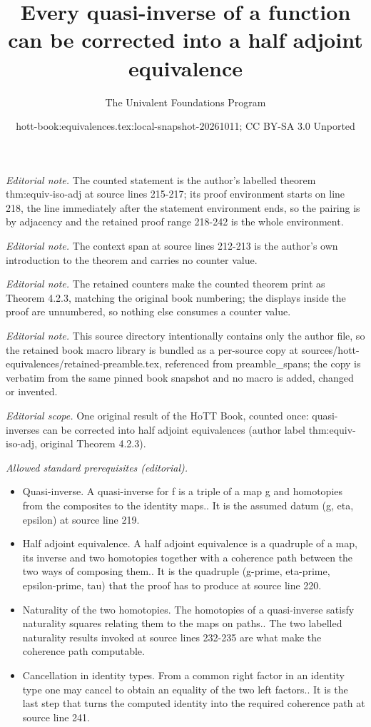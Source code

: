 \documentclass[10pt,a4paper]{article}
\title{Every quasi-inverse of a function can be corrected into a half adjoint equivalence}
\author{The Univalent Foundations Program}
\date{hott-book:equivalences.tex:local-snapshot-20261011; CC BY-SA 3.0 Unported}
\newcounter{chapter}
\theoremstyle{definition}
\theoremstyle{remark}
\numberwithin{equation}{section}
\begin{document}
\maketitle
\setcounter{chapter}{4}
\setcounter{section}{2}
\setcounter{thm}{2}
\noindent\textit{Editorial note.} The counted statement is the author's labelled theorem thm:equiv-iso-adj at source lines 215-217; its proof environment starts on line 218, the line immediately after the statement environment ends, so the pairing is by adjacency and the retained proof range 218-242 is the whole environment.\par\medskip
\noindent\textit{Editorial note.} The context span at source lines 212-213 is the author's own introduction to the theorem and carries no counter value.\par\medskip
\noindent\textit{Editorial note.} The retained counters make the counted theorem print as Theorem 4.2.3, matching the original book numbering; the displays inside the proof are unnumbered, so nothing else consumes a counter value.\par\medskip
\noindent\textit{Editorial note.} This source directory intentionally contains only the author file, so the retained book macro library is bundled as a per-source copy at sources/hott-equivalences/retained-preamble.tex, referenced from preamble\_spans; the copy is verbatim from the same pinned book snapshot and no macro is added, changed or invented.\par\medskip
\noindent\textit{Editorial scope.} One original result of the HoTT Book, counted once: quasi-inverses can be corrected into half adjoint equivalences (author label thm:equiv-iso-adj, original Theorem 4.2.3).\par\medskip
\noindent\textit{Allowed standard prerequisites (editorial).}\begin{itemize}
\item Quasi-inverse. A quasi-inverse for f is a triple of a map g and homotopies from the composites to the identity maps.. It is the assumed datum (g, eta, epsilon) at source line 219.
\item Half adjoint equivalence. A half adjoint equivalence is a quadruple of a map, its inverse and two homotopies together with a coherence path between the two ways of composing them.. It is the quadruple (g-prime, eta-prime, epsilon-prime, tau) that the proof has to produce at source line 220.
\item Naturality of the two homotopies. The homotopies of a quasi-inverse satisfy naturality squares relating them to the maps on paths.. The two labelled naturality results invoked at source lines 232-235 are what make the coherence path computable.
\item Cancellation in identity types. From a common right factor in an identity type one may cancel to obtain an equality of the two left factors.. It is the last step that turns the computed identity into the required coherence path at source line 241.
\end{itemize}\medskip
\end{document}
